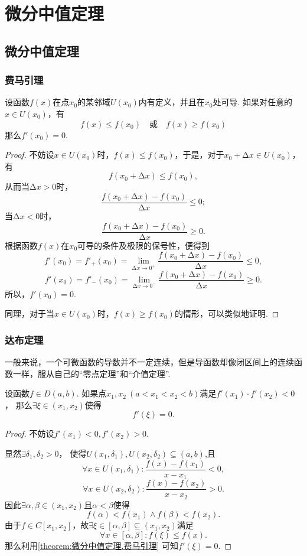 \chapter{微分中值定理}

\section{微分中值定理}

\subsection{费马引理}
\begin{lemma}[费马引理]\label{theorem:微分中值定理.费马引理}
设函数\(f(x)\)在点\(x_0\)的某邻域\(U(x_0)\)内有定义，并且在\(x_0\)处可导.
如果对任意的\(x \in U(x_0)\)，有
\[f(x) \leq f(x_0) \quad \text{或} \quad f(x) \geq f(x_0)\]
那么\(f'(x_0) = 0\).
\begin{proof}
不妨设\(x \in U(x_0)\)时，\(f(x) \leq f(x_0)\)，于是，对于\(x_0 + \increment x \in U(x_0)\)，有\[
f(x_0 + \increment x) \leq f(x_0),
\]从而当\(\increment x > 0\)时，\[
\frac{f(x_0 + \increment x) - f(x_0)}{\increment x} \leq 0;
\]当\(\increment x < 0\)时，\[
\frac{f(x_0 + \increment x) - f(x_0)}{\increment x} \geq 0.
\]根据函数\(f(x)\)在\(x_0\)可导的条件及极限的保号性，便得到\[
f'(x_0) = f'_+(x_0) = \lim\limits_{\increment x\to0^+} \frac{f(x_0 + \increment x) - f(x_0)}{\increment x} \leq 0,
\]\[
f'(x_0) = f'_-(x_0) = \lim\limits_{\increment x\to0^-} \frac{f(x_0 + \increment x) - f(x_0)}{\increment x} \geq 0.
\]所以，\(f'(x_0) = 0\).

同理，对于当\(x \in U(x_0)\)时，\(f(x) \geq f(x_0)\)的情形，可以类似地证明.
\end{proof}
\end{lemma}

\subsection{达布定理}
一般来说，一个可微函数的导数并不一定连续，但是导函数却像闭区间上的连续函数一样，服从自己的“零点定理”和“介值定理”.

\begin{theorem}[达布零点定理]\label{theorem:微分中值定理.达布定理1}
设函数\(f \in D(a,b)\).
如果点\(x_1,x_2\ (a<x_1<x_2<b)\)满足\(f'(x_1) \cdot f'(x_2) < 0\)，%
那么\(\exists\xi\in(x_1,x_2)\)使得\[
f'(\xi) = 0.
\]
\begin{proof}
不妨设\(f'(x_1)<0,f'(x_2)>0\).

显然\(\exists\delta_1,\delta_2>0\)，%
使得\(U(x_1,\delta_1),U(x_2,\delta_2)\subseteq(a,b)\),且\[
\forall x \in U(x_1,\delta_1): \frac{f(x)-f(x_1)}{x-x_1}<0,
\]\[
\forall x \in U(x_2,\delta_2): \frac{f(x)-f(x_2)}{x-x_2}>0.
\]因此\(\exists\alpha,\beta\in(x_1,x_2)\)且\(\alpha<\beta\)使得\[
f(\alpha)<f(x_1) \land f(\beta)<f(x_2).
\]
由于\(f \in C[x_1,x_2]\)，故\(\exists\xi\in[\alpha,\beta]\subseteq(x_1,x_2)\)满足\[
\forall x\in[\alpha,\beta]: f(\xi) \leq f(x).
\]
那么利用\cref{theorem:微分中值定理.费马引理} 可知\(f'(\xi)=0\).
\end{proof}
\end{theorem}

